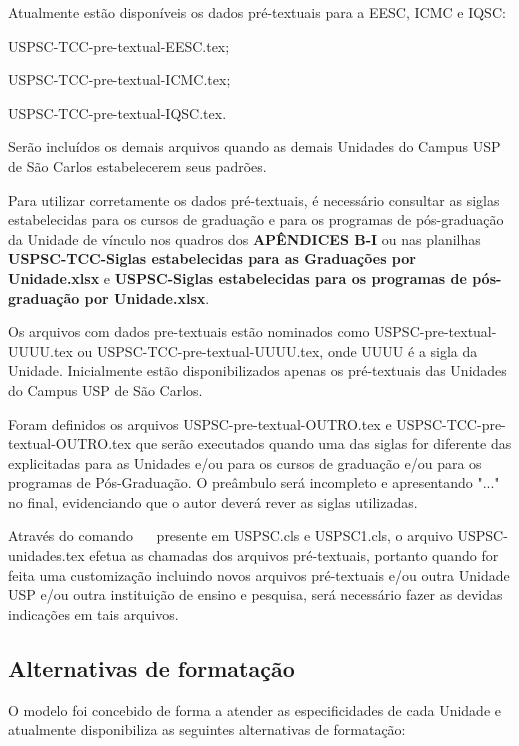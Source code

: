 Atualmente estão disponíveis os dados pr\'e-textuais para a EESC, ICMC e IQSC:
			
			\begin{alineas}	 
				\item USPSC-TCC-pre-textual-EESC.tex;
				\item USPSC-TCC-pre-textual-ICMC.tex;
				\item USPSC-TCC-pre-textual-IQSC.tex.
			\end{alineas}
			
Serão incluídos os demais arquivos quando as demais Unidades do Campus USP de São Carlos estabelecerem seus padrões. 
			
Para utilizar corretamente os dados pr\'e-textuais, \'e necess\'ario consultar as siglas estabelecidas para os cursos de graduação e para os programas de pós-graduação da Unidade de vínculo nos quadros dos \textbf{APÊNDICES B-I} ou nas planilhas \textbf{USPSC-TCC-Siglas estabelecidas para as Graduações por Unidade.xlsx} e \textbf{USPSC-Siglas estabelecidas para os programas de pós-graduação por Unidade.xlsx}. 

Os arquivos com dados pre-textuais estão nominados como USPSC-pre-textual-UUUU.tex ou USPSC-TCC-pre-textual-UUUU.tex, onde UUUU \'e a sigla da Unidade. Inicialmente estão disponibilizados apenas os pr\'e-textuais das Unidades do Campus USP de São Carlos.
			
Foram definidos os arquivos USPSC-pre-textual-OUTRO.tex e USPSC-TCC-pre-textual-OUTRO.tex que serão executados quando uma das siglas for diferente das explicitadas para as Unidades e/ou para os cursos de graduação e/ou para os programas de Pós-Graduação. O pre\^ambulo ser\'a incompleto e apresentando "..." no final, evidenciando que o autor dever\'a rever as siglas utilizadas.

Atrav\'es do comando \verb+  + presente em USPSC.cls e USPSC1.cls,  o arquivo USPSC-unidades.tex efetua as chamadas dos arquivos pr\'e-textuais, portanto quando for feita uma customização incluindo novos arquivos pr\'e-textuais e/ou outra Unidade USP e/ou outra instituição de ensino e pesquisa, ser\'a necess\'ario fazer as devidas indicações em tais arquivos. 
	 
\subsection{Alternativas de formatação}
O modelo foi concebido de forma a atender as especificidades de cada Unidade e atualmente disponibiliza as seguintes alternativas de formatação:
